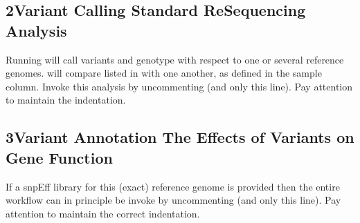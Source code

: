 \documentclass[letterpaper,10pt,english]{sphinxmanual}
\begin{document}
\subsection{2\sphinxhyphen{}Variant Calling \sphinxhyphen{} Standard Re\sphinxhyphen{}Sequencing Analysis}
\label{\detokenize{index:variant-calling-standard-re-sequencing-analysis}}
Running  will call variants and genotype  with respect to one or several reference genomes.  will compare  listed in  with one another, as defined in the sample column. Invoke this analysis by uncommenting  (and only this line). Pay attention to maintain the indentation.

\begin{sphinxVerbatim}[commandchars=\\\{\}]
 
\end{sphinxVerbatim}


\subsection{3\sphinxhyphen{}Variant Annotation \sphinxhyphen{} The Effects of Variants on Gene Function}
\label{\detokenize{index:variant-annotation-the-effects-of-variants-on-gene-function}}
If a snpEff library for this (exact) reference genome is provided then the entire workflow can in principle be invoke by uncommenting  (and only this line). Pay attention to maintain the correct indentation.

\begin{sphinxVerbatim}[commandchars=\\\{\}]
 
\end{sphinxVerbatim}
\end{document}
